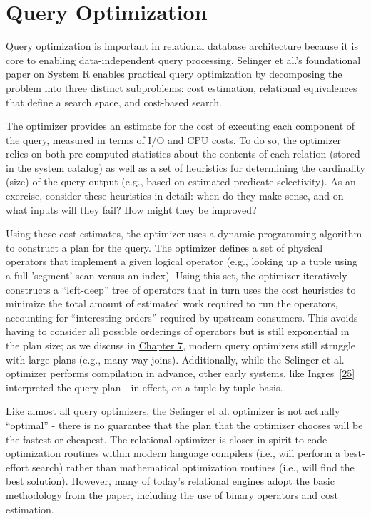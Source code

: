\documentclass[b5paper,11pt,twoside,openright]{book}
\newcommand\Section[2]{
  \hypertarget{#1}{
    \section{#2}
  }
}
\begin{document}
\Section{query-optimization}{Query Optimization}

Query optimization is important in relational database architecture
because it is core to enabling data-independent query processing.
Selinger et al.'s foundational paper on System R enables practical query
optimization by decomposing the problem into three distinct subproblems:
cost estimation, relational equivalences that define a search space, and
cost-based search.

The optimizer provides an estimate for the cost of executing each
component of the query, measured in terms of I/O and CPU costs. To do
so, the optimizer relies on both pre-computed statistics about the
contents of each relation (stored in the system catalog) as well as a
set of heuristics for determining the cardinality (size) of the query
output (e.g., based on estimated predicate selectivity). As an exercise,
consider these heuristics in detail: when do they make sense, and on
what inputs will they fail? How might they be improved?

Using these cost estimates, the optimizer uses a dynamic programming
algorithm to construct a plan for the query. The optimizer defines a set
of physical operators that implement a given logical operator (e.g.,
looking up a tuple using a full 'segment' scan versus an index). Using
this set, the optimizer iteratively constructs a ``left-deep'' tree of
operators that in turn uses the cost heuristics to minimize the total
amount of estimated work required to run the operators, accounting for
``interesting orders'' required by upstream consumers. This avoids
having to consider all possible orderings of operators but is still
exponential in the plan size; as we discuss in
\hyperref[ch7-queryoptimization]{Chapter 7}, modern query optimizers
still struggle with large plans (e.g., many-way joins). Additionally,
while the Selinger et al. optimizer performs compilation in advance,
other early systems, like
Ingres~{{[}\protect\hyperlink{ref-ingres}{25}{]}} interpreted the query
plan - in effect, on a tuple-by-tuple basis.

Like almost all query optimizers, the Selinger et al. optimizer is not
actually ``optimal'' - there is no guarantee that the plan that the
optimizer chooses will be the fastest or cheapest. The relational
optimizer is closer in spirit to code optimization routines within
modern language compilers (i.e., will perform a best-effort search)
rather than mathematical optimization routines (i.e., will find the best
solution). However, many of today's relational engines adopt the basic
methodology from the paper, including the use of binary operators and
cost estimation.
\end{document}
